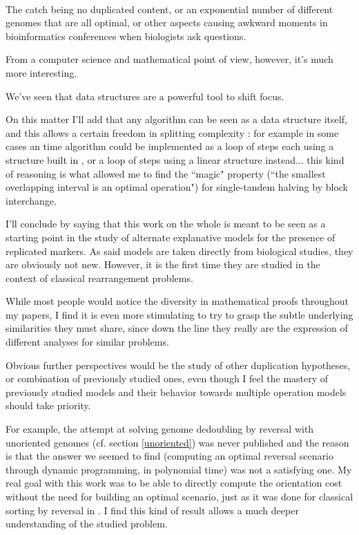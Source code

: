\documentclass[11pt,final,twoside,nofrench]{thlifl}
\begin{document}
{~

The catch being no duplicated content, or an exponential number of different genomes that are all optimal, or other aspects causing awkward moments in bioinformatics conferences when biologists ask questions.

From a computer science and mathematical point of view, however, it's much more interesting.

We've seen that data structures are a powerful tool to shift focus.

On this matter I'll add that any algorithm can be seen as a data structure itself, and this allows a certain freedom in splitting complexity : for example in some cases an   time algorithm could be implemented as a loop of  steps each using a structure built in , or a loop of  steps using a linear structure instead... this kind of reasoning is what allowed me to find the ``magic" property (``the smallest overlapping interval is an optimal operation") for single-tandem halving by block interchange.

I'll conclude by saying that this work on the whole is meant to be seen as a starting point in the study of alternate explanative models for the presence of replicated markers. As said models are taken directly from biological studies, they are obviously not new. However, it is the first time they are studied in the context of classical rearrangement problems.

While most people would notice the diversity in mathematical proofs throughout my papers, I find it is even more stimulating to try to grasp the subtle underlying similarities they must share, since down the line they really are the expression of different analyses for similar problems.

Obvious further perspectives would be the study of other duplication hypotheses, or combination of previously studied ones, even though I feel the mastery of previously studied models and their behavior towards multiple operation models should take priority.

For example, the attempt at solving genome dedoubling by reversal with unoriented genomes (cf. section \ref{unoriented}) was never published and the reason is that the answer we seemed to find (computing an optimal reversal scenario through dynamic programming, in polynomial time) was not a satisfying one. My real goal with this work was to be able to directly compute the orientation cost without the need for building an optimal scenario, just as it was done for classical sorting by reversal in \cite{BMS-04}. I find this kind of result allows a much deeper understanding of the studied problem.

}
\end{document}
